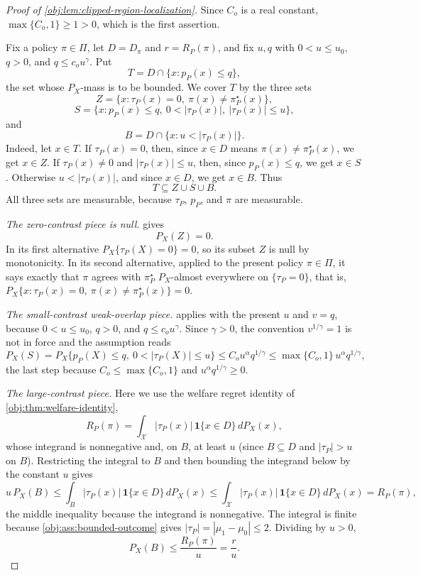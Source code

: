 \documentclass[11pt]{article}
\begin{document}
\begin{proof}[Proof of \cref{obj:lem:clipped-region-localization}]
Since \(C_o\) is a real constant, \(\max\{C_o,1\}\ge1>0\), which is the first assertion. %

Fix a policy \(\pi\in\Pi\), let \(D=D_\pi\) and \(r=R_P(\pi)\), and fix \(u,q\) with
\(0<u\le u_0\), \(q>0\), and \(q\le c_o u^\gamma\).  Put
\[
T=D\cap\{x:p_P(x)\le q\},
\]
the set whose \(P_X\)-mass is to be bounded.  We cover \(T\) by the three sets
\[
Z=\{x:\tau_P(x)=0,\ \pi(x)\ne\pi^\star_P(x)\},
\]
\[
S=\{x:p_P(x)\le q,\ 0<|\tau_P(x)|,\ |\tau_P(x)|\le u\},
\]
and
\[
B=D\cap\{x:u<|\tau_P(x)|\}.
\]
Indeed, let \(x\in T\).  If \(\tau_P(x)=0\), then, since \(x\in D\) means \(\pi(x)\ne\pi^\star_P(x)\), we get \(x\in Z\).  If \(\tau_P(x)\ne0\) and \(|\tau_P(x)|\le u\), then, since \(p_P(x)\le q\), we get \(x\in S\).  Otherwise \(u<|\tau_P(x)|\), and since \(x\in D\), we get \(x\in B\).  Thus
\[
T\subseteq Z\cup S\cup B .
\]
All three sets are measurable, because \(\tau_P\), \(p_P\), and \(\pi\) are measurable. %

\emph{The zero-contrast piece is null.}   gives
\[
P_X(Z)=0 .
\]
In its first alternative \(P_X\{\tau_P(X)=0\}=0\), so its subset \(Z\) is null by monotonicity.  In its second alternative, applied to the present policy \(\pi\in\Pi\), it says exactly that \(\pi\) agrees with \(\pi^\star_P\) \(P_X\)-almost everywhere on \(\{\tau_P=0\}\), that is, \(P_X\{x:\tau_P(x)=0,\ \pi(x)\ne\pi^\star_P(x)\}=0\). %

\emph{The small-contrast weak-overlap piece.}   applies with the present \(u\) and \(v=q\), because \(0<u\le u_0\), \(q>0\), and \(q\le c_o u^\gamma\).  Since \(\gamma>0\), the convention \(v^{1/\gamma}=1\) is not in force and the assumption reads
\[
P_X(S)=P_X\{p_P(X)\le q,\ 0<|\tau_P(X)|\le u\}\le C_o u^\alpha q^{1/\gamma}
\le \max\{C_o,1\}\,u^\alpha q^{1/\gamma},
\]
the last step because \(C_o\le\max\{C_o,1\}\) and \(u^\alpha q^{1/\gamma}\ge0\). %

\emph{The large-contrast piece.}  Here we use the welfare regret identity of \cref{obj:thm:welfare-identity},
\[
R_P(\pi)=\int_{\mathcal X}|\tau_P(x)|\,\mathbf 1\{x\in D\}\,dP_X(x),
\]
whose integrand is nonnegative and, on \(B\), at least \(u\) (since \(B\subseteq D\) and \(|\tau_P|>u\) on \(B\)).  Restricting the integral to \(B\) and then bounding the integrand below by the constant \(u\) gives
\[
u\,P_X(B)
\le
\int_B|\tau_P(x)|\,\mathbf 1\{x\in D\}\,dP_X(x)
\le
\int_{\mathcal X}|\tau_P(x)|\,\mathbf 1\{x\in D\}\,dP_X(x)
=
R_P(\pi),
\]
the middle inequality because the integrand is nonnegative.  The integral is finite because \cref{obj:ass:bounded-outcome} gives \(|\tau_P|=|\mu_1-\mu_0|\le2\).  Dividing by \(u>0\),
\[
P_X(B)\le \frac{R_P(\pi)}{u}=\frac{r}{u}.
\]


\end{proof}
\end{document}
